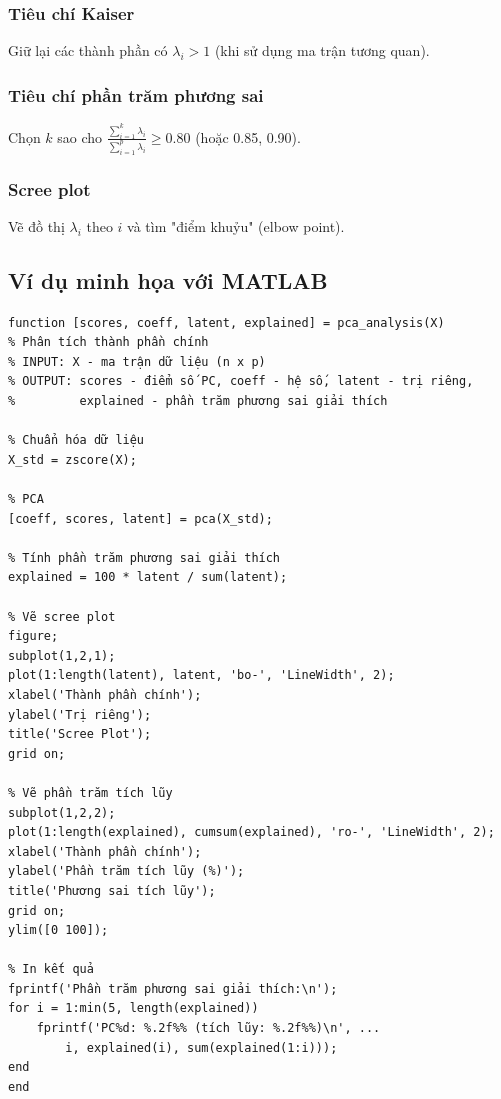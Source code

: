 \subsubsection*{Tiêu chí Kaiser}
Giữ lại các thành phần có $\lambda_i > 1$ (khi sử dụng ma trận tương quan).

\subsubsection*{Tiêu chí phần trăm phương sai}
Chọn $k$ sao cho $\frac{\sum_{i=1}^k \lambda_i}{\sum_{i=1}^p \lambda_i} \geq 0.80$ (hoặc 0.85, 0.90).

\subsubsection*{Scree plot}
Vẽ đồ thị $\lambda_i$ theo $i$ và tìm "điểm khuỷu" (elbow point).

\subsection{Ví dụ minh họa với MATLAB}
\begin{matlab}
\begin{lstlisting}
function [scores, coeff, latent, explained] = pca_analysis(X)
% Phân tích thành phần chính
% INPUT: X - ma trận dữ liệu (n x p)
% OUTPUT: scores - điểm số PC, coeff - hệ số, latent - trị riêng, 
%         explained - phần trăm phương sai giải thích

% Chuẩn hóa dữ liệu
X_std = zscore(X);

% PCA
[coeff, scores, latent] = pca(X_std);

% Tính phần trăm phương sai giải thích
explained = 100 * latent / sum(latent);

% Vẽ scree plot
figure;
subplot(1,2,1);
plot(1:length(latent), latent, 'bo-', 'LineWidth', 2);
xlabel('Thành phần chính');
ylabel('Trị riêng');
title('Scree Plot');
grid on;

% Vẽ phần trăm tích lũy
subplot(1,2,2);
plot(1:length(explained), cumsum(explained), 'ro-', 'LineWidth', 2);
xlabel('Thành phần chính');
ylabel('Phần trăm tích lũy (%)');
title('Phương sai tích lũy');
grid on;
ylim([0 100]);

% In kết quả
fprintf('Phần trăm phương sai giải thích:\n');
for i = 1:min(5, length(explained))
    fprintf('PC%d: %.2f%% (tích lũy: %.2f%%)\n', ...
        i, explained(i), sum(explained(1:i)));
end
end
\end{lstlisting}
\end{matlab}

